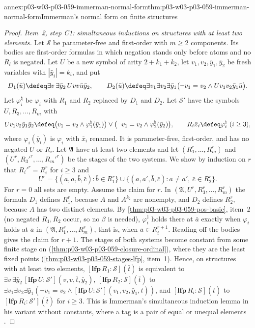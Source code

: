 \begin{annexitem}{annex:p03-w03-p03-059-immerman-normal-form}{thm:p03-w03-p03-059-immerman-normal-form}{Immerman's normal form on finite structures}
\begin{proof}
\emph{Item~2, step C1: simultaneous inductions on structures with at least
two elements.} Let \(\mathcal S\) be parameter-free and first-order with
\(m\geq2\) components. Its bodies are first-order formulas in which
negation stands only before atoms and no \(R_l\) is negated. Let \(U\) be
a new symbol of arity \(2+k_1+k_2\), let \(v_1,v_2,\bar y_1,\bar y_2\) be
fresh variables with \(|\bar y_i|=k_i\), and put
\[
 D_1(\bar u)\defeq\exists v\,\exists\bar y_2\,Uvv\bar u\bar y_2,\qquad
 D_2(\bar u)\defeq\exists v_1\exists v_2\exists\bar y_1\bigl(\neg v_1=v_2\land
 Uv_1v_2\bar y_1\bar u\bigr).
\]
Let \(\varphi_i^\natural\) be \(\varphi_i\) with \(R_1\) and \(R_2\)
replaced by \(D_1\) and \(D_2\). Let \(\mathcal S'\) have the symbols
\(U,R_3,\ldots,R_m\) with
\[
 Uv_1v_2\bar y_1\bar y_2\defeq\bigl(v_1=v_2\land\varphi_1^\natural(\bar y_1)\bigr)
 \lor\bigl(\neg v_1=v_2\land\varphi_2^\natural(\bar y_2)\bigr),
 \qquad R_i\bar x_i\defeq\varphi_i^\natural\ (i\geq3),
\]
where \(\varphi_i(\bar y_i)\) is \(\varphi_i\) with \(\bar x_i\) renamed. It
is parameter-free, first-order, and has no negated \(U\) or \(R_i\). Let
\(\mathfrak A\) have at least two elements and let \((R_1^r,\ldots,R_m^r)\)
and \((U^r,R_3'^r,\ldots,R_m'^r)\) be the stages of the two systems. We
show by induction on \(r\) that \(R_i'^r=R_i^r\) for \(i\geq3\) and
\[
 U^r=\{(a,a,\bar b,\bar c):\bar b\in R_1^r\}\cup
 \{(a,a',\bar b,\bar c):a\neq a',\ \bar c\in R_2^r\}.
\]
For \(r=0\) all sets are empty. Assume the claim for \(r\). In
\((\mathfrak A,U^r,R_3^r,\ldots,R_m^r)\) the formula \(D_1\) defines
\(R_1^r\), because \(A\) and \(A^{k_2}\) are nonempty, and \(D_2\) defines
\(R_2^r\), because \(A\) has two distinct elements. By
\cref{thm:p03-w03-p03-059-pos-basic}, item~2 (no negated \(R_1,R_2\)
occur, so no \(\beta\) is needed), \(\varphi_i^\natural\) holds there at
\(\bar a\) exactly when \(\varphi_i\) holds at \(\bar a\) in
\((\mathfrak A,R_1^r,\ldots,R_m^r)\), that is, when
\(\bar a\in R_i^{r+1}\). Reading off the bodies gives the claim for
\(r+1\). The stages of both systems become constant from some finite stage
on (\cref{thm:p03-w03-p03-059-closure-ordinal}), where they are the least
fixed points (\cref{thm:p03-w03-p03-059-stages-lfp}, item~1). Hence, on
structures with at least two elements, \([\mathbf{lfp}\,R_1:\mathcal
S](\bar t)\) is equivalent to \(\exists v\,\exists\bar y_2\,
[\mathbf{lfp}\,U:\mathcal S'](v,v,\bar t,\bar y_2)\),
\([\mathbf{lfp}\,R_2:\mathcal S](\bar t)\) to
\(\exists v_1\exists v_2\exists\bar y_1(\neg v_1=v_2\land
[\mathbf{lfp}\,U:\mathcal S'](v_1,v_2,\bar y_1,\bar t))\), and
\([\mathbf{lfp}\,R_i:\mathcal S](\bar t)\) to
\([\mathbf{lfp}\,R_i:\mathcal S'](\bar t)\) for \(i\geq3\). This is
Immerman's simultaneous induction lemma in his variant without constants,
where a tag is a pair of equal or unequal elements
\cite[Lemma~4.1, pp.~95--96]{Immerman1986}.


\end{proof}
\end{annexitem}
